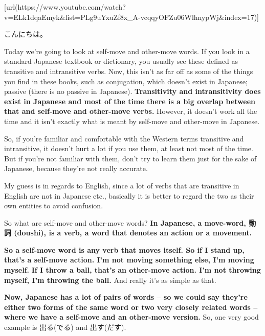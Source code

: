 \startsectionlevel[title={{\bf 15. Transitive & intransitive verbs}},reference={transitive-intransitive-verbs}]

[url(https://www.youtube.com/watch?v=ELk1dqaEmyk&list=PLg9uYxuZf8x_A-vcqqyOFZu06WlhnypWj&index=17)]

こんにちは。

Today we're going to look at self-move and other-move words. If you look in a standard Japanese textbook or dictionary, you usually see these defined as transitive and intransitive verbs. Now, this isn't as far off as some of the things you find in these books, such as conjugation, which doesn't exist in Japanese; passive (there is no passive in Japanese). {\bf Transitivity and intransitivity does exist in Japanese and most of the time there is a big overlap between that and self-move and other-move verbs.} However, it doesn't work all the time and it isn't exactly what is meant by self-move and other-move in Japanese.

So, if you're familiar and comfortable with the Western terms transitive and intransitive, it doesn't hurt a lot if you use them, at least not most of the time. But if you're not familiar with them, don't try to learn them just for the sake of Japanese, because they're not really accurate.

My guess is in regards to English, since a lot of verbs that are transitive in English are not in Japanese etc., basically it is better to regard the two as their own entities to avoid confusion.

\thinrule

So what are self-move and other-move words? {\bf In Japanese, a move-word, 動詞 (doushi), is a verb, a word that denotes an action or a movement.}

\thinrule

{\bf So a self-move word is any verb that moves itself. So if I stand up, that's a self-move action. I'm not moving something else, I'm moving myself.} {\bf If I throw a ball, that's an other-move action. I'm not throwing myself, I'm throwing the ball.} And really it's as simple as that.

\thinrule

{\bf Now, Japanese has a lot of pairs of words -- so we could say they're either two forms of the same word or two very closely related words -- where we have a self-move and an other-move version.} So, one very good example is 出る(でる) and 出す(だす).

